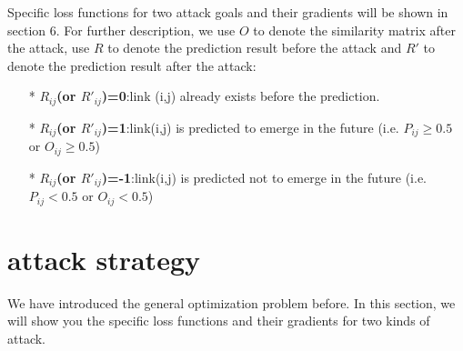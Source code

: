 \documentclass{acmtog} %
\begin{document}
\indent Specific loss functions for two attack goals and their gradients will be shown in section 6. For further description, we use $O$ to denote the similarity matrix after the attack, use $R$ to denote the prediction result before the attack and $R'$ to denote the prediction result after the attack:
\begin{itemize}
	\item[*] {\bfseries$R_{ij}$(or $R'_{ij}$)=0}:link (i,j) already exists before the prediction.
	\item[*] {\bfseries$R_{ij}$(or $R'_{ij}$)=1}:link(i,j) is predicted to emerge in the future (i.e. $P_{ij}\ge 0.5$ or $O_{ij}\ge 0.5$)
	\item[*] {\bfseries$R_{ij}$(or $R'_{ij}$)=-1}:link(i,j) is predicted not to emerge in the future (i.e. $P_{ij}<0.5$ or $O_{ij}<0.5$)
\end{itemize}

\section{attack strategy}
We have introduced the general optimization problem before. In this section, we will show you the specific loss functions and their gradients for two kinds of attack.
\end{document}
